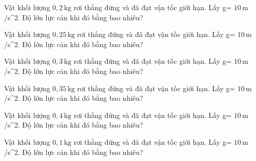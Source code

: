 \begin{ex}
Vật khối lượng $0,2\,\text{kg}$ rơi thẳng đứng và đã đạt vận tốc giới hạn. Lấy g= $10\,\text{m}$ /s^2. Độ lớn lực cản khi đó bằng bao nhiêu?
\end{ex}

\begin{ex}
Vật khối lượng $0,25\,\text{kg}$ rơi thẳng đứng và đã đạt vận tốc giới hạn. Lấy g= $10\,\text{m}$ /s^2. Độ lớn lực cản khi đó bằng bao nhiêu?
\end{ex}

\begin{ex}
Vật khối lượng $0,3\,\text{kg}$ rơi thẳng đứng và đã đạt vận tốc giới hạn. Lấy g= $10\,\text{m}$ /s^2. Độ lớn lực cản khi đó bằng bao nhiêu?
\end{ex}

\begin{bt}
Vật khối lượng $0,35\,\text{kg}$ rơi thẳng đứng và đã đạt vận tốc giới hạn. Lấy g= $10\,\text{m}$ /s^2. Độ lớn lực cản khi đó bằng bao nhiêu?
\end{bt}

\begin{bt}
Vật khối lượng $0,4\,\text{kg}$ rơi thẳng đứng và đã đạt vận tốc giới hạn. Lấy g= $10\,\text{m}$ /s^2. Độ lớn lực cản khi đó bằng bao nhiêu?
\end{bt}

\begin{bt}
Vật khối lượng $0,1\,\text{kg}$ rơi thẳng đứng và đã đạt vận tốc giới hạn. Lấy g= $10\,\text{m}$ /s^2. Độ lớn lực cản khi đó bằng bao nhiêu?
\end{bt}

